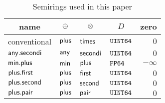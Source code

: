 \begin{table}
    \centering
    \begin{tabular}{llllr}
        \toprule
        \multicolumn{1}{c}{name} & \multicolumn{1}{c}{$\oplus$} & \multicolumn{1}{c}{$\otimes$} & \multicolumn{1}{c}{$D$} & \multicolumn{1}{c}{zero} \\ \midrule
        conventional             & $\mathbin{\mathsf{plus}}$                 & $\mathbin{\mathsf{times}}$                 & $\mathtt{UINT64}$              & $0$                      \\
        $\mathbin{\mathsf{any.secondi}}$         & $\mathbin{\mathsf{any}}$                      & $\mathbin{\mathsf{secondi}}$                   & $\mathtt{UINT64}$              & $0$                      \\
        $\mathbin{\mathsf{min.plus}}$            & $\mathbin{\mathsf{min}}$                      & $\mathbin{\mathsf{plus}}$                  & $\mathtt{FP64}$            & $-\infty$                \\
        $\mathbin{\mathsf{plus.first}}$          & $\mathbin{\mathsf{plus}}$                 & $\mathbin{\mathsf{first}}$                     & $\mathtt{UINT64}$              & $0$                      \\
        $\mathbin{\mathsf{plus.second}}$         & $\mathbin{\mathsf{plus}}$                 & $\mathbin{\mathsf{second}}$                    & $\mathtt{UINT64}$              & $0$                      \\
        $\mathbin{\mathsf{plus.pair}}$           & $\mathbin{\mathsf{plus}}$                 & $\mathbin{\mathsf{pair}}$                      & $\mathtt{UINT64}$              & $0$                      \\
        \bottomrule
    \end{tabular}
    \caption{Semirings used in this paper}
    \label{tab:semirings}
\end{table}
